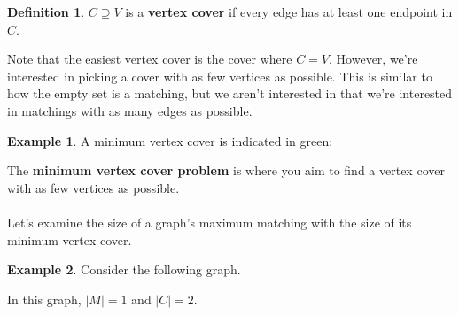 \documentclass[]{article}
\theoremstyle{definition}
\newtheorem*{defn}{Definition}
\newtheorem{ex}{Example}[section]
\begin{document}
			\begin{defn}
				$C \supseteq V$ is a \textbf{vertex cover} if every edge has at least one endpoint in $C$.
			\end{defn}
			
			Note that the easiest vertex cover is the cover where $C = V$. However, we're interested in picking a cover with as few vertices as possible. This is similar to how the empty set is a matching, but we aren't interested in that \textendash{} we're interested in matchings with as many edges as possible.
			
			\begin{ex}
				A minimum vertex cover is indicated in green:
				\begin{center}
				\end{center}
			\end{ex}
			
			The \textbf{minimum vertex cover problem} is where you aim to find a vertex cover with as few vertices as possible.
			\\ \\
			Let's examine the size of a graph's maximum matching with the size of its minimum vertex cover.
			
			\begin{ex}
				Consider the following graph.
				\begin{center}
				\end{center}
				
				In this graph, $|M| = 1$ and $|C| = 2$.
			\end{ex}
			
\end{document}

